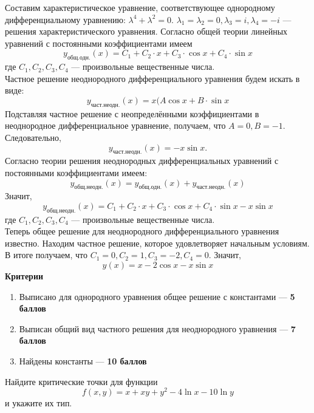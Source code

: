 \documentclass[addpoints, answers]{exam} %
\begin{document}
\begin{questions}
\begin{solution}
Составим характеристическое уравнение, соответствующее однородному дифференциальному уравнению: $\lambda^4+\lambda^2=0$.
\smallskip
$\lambda_1=\lambda_2=0, \lambda_3=i,\lambda_4=-i$ --- решения характеристического уравнения.
Согласно общей теории линейных уравнений с постоянными коэффициентами имеем 
\[
y_{\text{общ.одн.}}(x)=C_1+C_2\cdot x+C_3\cdot \cos x+C_4\cdot \sin x
\]
  где $C_1,C_2,C_3,C_4$ --- произвольные вещественные числа.\\
Частное решение неоднородного дифференциального уравнения будем искать в виде:
\[
y_{\text{част.неодн.}}(x)=x(A \cos x+B\cdot \sin x
\]
Подставляя частное решение с неопределёнными коэффициентами в неоднородное дифференциальное уравнение, получаем, что $A=0, B=-1$. \\
Следовательно, 
\[
y_{\text{част.неодн.}}(x)=-x\sin x.
\]
Согласно теории решения неоднородных дифференциальных уравнений с постоянными коэффициентами имеем:
\[
y_{\text{общ.неодн.}}(x)=y_{\text{общ.одн.}}(x)+y_{\text{част.неодн.}}(x)
\]
Значит,
\[
y_{\text{общ.неодн.}}(x)=C_1+C_2\cdot x+C_3\cdot \cos x+C_4\cdot \sin x-x\sin x
\] где $C_1,C_2,C_3,C_4$ --- произвольные вещественные числа.\\
Теперь общее решение для неоднородного дифференциального уравнения известно. Находим частное решение, которое удовлетворяет начальным условиям. В итоге получаем, что $C_1=0, C_2=1, C_3=-2, C_4=0$. Значит,
\[
y(x)=x-2\cos x-x\sin x
\]
\textbf{Критерии}
\begin{enumerate}
\item Выписано для однородного уравнения общее решение с константами --- \textbf{5 баллов}
\item Выписан общий вид частного решения для неоднородного уравнения --- \textbf{7 баллов}
\item Найдены константы --- \textbf{10 баллов}
\end{enumerate}
\end{solution}

\question Найдите критические точки для функции
\[
f(x,y)=x+xy+y^2-4\ln x-10\ln y
\]
и укажите их тип.\\


\end{questions}
\end{document}
